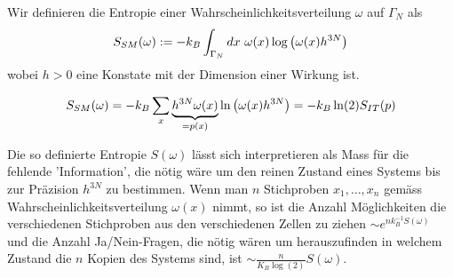\begin{definition}
    Wir definieren die Entropie einer Wahrscheinlichkeitsverteilung $\omega$
    auf $\Gamma_N$ als
    \begin{align*}
        S_{SM}(\omega) := - k_B \int_{\Gamma_N} dx \ \omega(x) \log \left( \omega(x) h^{3N} \right)
    \end{align*}
    wobei $h>0$ eine Konstate mit der Dimension einer Wirkung ist.
\end{definition}

\begin{bemerkung}
    \begin{align*}
        S_{SM}(\omega) = - k_B \sum_x \underbrace{h^{3N} \omega(x)}_{= p(x)} \ln \left( \omega(x) h^{3N} \right)
        = - k_B \ln(2) S_{IT}(p)
    \end{align*}
\end{bemerkung}

\begin{bemerkung}
    Die so definierte Entropie $S(\omega)$ lässt sich interpretieren als
    Mass für die fehlende 'Information', die nötig wäre um den reinen Zustand
    eines Systems bis zur Präzision $h^{3N}$ zu bestimmen. Wenn man $n$ Stichproben
    $x_1,\dots,x_n$ gemäss Wahrscheinlichkeitsverteilung $\omega(x)$ nimmt, so
    ist die Anzahl Möglichkeiten die verschiedenen Stichproben aus den
    verschiedenen Zellen zu ziehen $\sim e^{n k_B^{-1} S(\omega)}$ und die
    Anzahl Ja/Nein-Fragen, die nötig wären um herauszufinden in welchem
    Zustand die $n$ Kopien des Systems sind, ist $\sim \frac{n}{K_B \log(2)}
    S(\omega)$.
\end{bemerkung}

